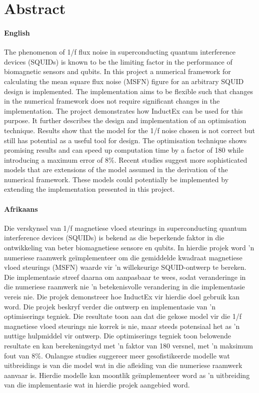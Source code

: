 \chapter*{Abstract}
\makeatletter{}\makeatother

\subsubsection*{English}

The phenomenon of 1/f flux noise in superconducting quantum interference devices (SQUIDs) is known to be the limiting factor in the performance of biomagnetic sensors and qubits. In this project a numerical framework for calculating the mean square flux noise (MSFN) figure for an arbitrary SQUID design is implemented. The implementation aims to be flexible such that changes in the numerical framework does not require significant changes in the implementation. The project demonstrates how InductEx can be used for this purpose. It further describes the design and implementation of an optimisation technique. Results show that the model for the 1/f noise chosen is not correct but still has potential as a useful tool for design. The optimisation technique shows promising results and can speed up computation time by a factor of 180 while introducing a maximum error of $8\%$. Recent studies suggest more sophisticated models that are extensions of the model assumed in the derivation of the numerical framework. These models could potentially be implemented by extending the implementation presented in this project.


\subsubsection*{Afrikaans}

Die verskynsel van 1/f  magnetiese vloed steurings in superconducting quantum interference devices (SQUIDs) is bekend as die beperkende faktor in die ontwikkeling van beter biomagnetiese sensore en qubits. In hierdie projek word 'n numeriese raamwerk geïmplementeer om die gemiddelde kwadraat magnetiese vloed steurings (MSFN) waarde vir 'n willekeurige SQUID-ontwerp te bereken. Die implementasie streef daarna om aanpasbaar te wees, sodat veranderinge in die numeriese raamwerk nie 'n betekenisvolle verandering in die implementasie vereis nie. Die projek demonstreer hoe InductEx vir hierdie doel gebruik kan word. Die projek beskryf verder die ontwerp en implementasie van 'n optimiserings tegniek. Die resultate toon aan dat die gekose model vir die 1/f magnetiese vloed steurings nie korrek is nie, maar steeds potensiaal het as 'n nuttige hulpmiddel vir ontwerp. Die optimiserings tegniek toon belowende resultate en kan berekeningstyd met 'n faktor van 180 versnel, met 'n maksimum fout van $8\%$. Onlangse studies suggereer meer gesofistikeerde modelle wat uitbreidings is van die model wat in die afleiding van die numeriese raamwerk aanvaar is. Hierdie modelle kan moontlik geïmplementeer word as 'n uitbreiding van die implementasie wat in hierdie projek aangebied word.

